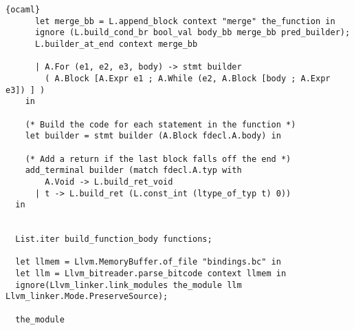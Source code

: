 \begin{lstlisting}{ocaml}
	  let merge_bb = L.append_block context "merge" the_function in
	  ignore (L.build_cond_br bool_val body_bb merge_bb pred_builder);
	  L.builder_at_end context merge_bb

      | A.For (e1, e2, e3, body) -> stmt builder
	    ( A.Block [A.Expr e1 ; A.While (e2, A.Block [body ; A.Expr e3]) ] )
    in

    (* Build the code for each statement in the function *)
    let builder = stmt builder (A.Block fdecl.A.body) in

    (* Add a return if the last block falls off the end *)
    add_terminal builder (match fdecl.A.typ with
        A.Void -> L.build_ret_void
      | t -> L.build_ret (L.const_int (ltype_of_typ t) 0))
  in


  List.iter build_function_body functions;

  let llmem = Llvm.MemoryBuffer.of_file "bindings.bc" in
  let llm = Llvm_bitreader.parse_bitcode context llmem in
  ignore(Llvm_linker.link_modules the_module llm Llvm_linker.Mode.PreserveSource);

  the_module

\end{lstlisting}
